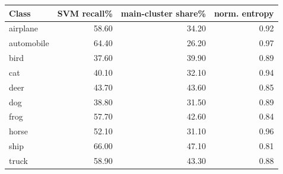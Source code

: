 \begin{tabular}{lrrr}
\toprule
Class & SVM recall\% & main-cluster share\% & norm. entropy \\
\midrule
airplane & 58.60 & 34.20 & 0.92 \\
automobile & 64.40 & 26.20 & 0.97 \\
bird & 37.60 & 39.90 & 0.89 \\
cat & 40.10 & 32.10 & 0.94 \\
deer & 43.70 & 43.60 & 0.85 \\
dog & 38.80 & 31.50 & 0.89 \\
frog & 57.70 & 42.60 & 0.84 \\
horse & 52.10 & 31.10 & 0.96 \\
ship & 66.00 & 47.10 & 0.81 \\
truck & 58.90 & 43.30 & 0.88 \\
\bottomrule
\end{tabular}
